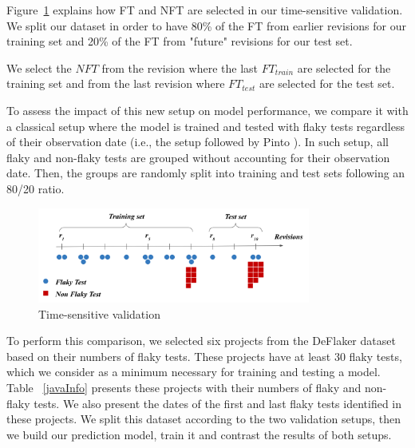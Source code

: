 Figure~\ref{time-validation} explains how FT and NFT are selected in our time-sensitive validation. We split our dataset in order to have 80\% of the FT from earlier revisions for our training set and 20\% of the FT from "future" revisions for our test set. 

We select the $NFT$ from the revision where the last $FT_{train}$ are selected for the training set and from the last revision where $FT_{test}$ are selected for the test set.

To assess the impact of this new setup on model performance, we compare it with a classical setup where the model is trained and tested with flaky tests regardless of their observation date (i.e., the setup followed by Pinto \etal).
In such setup, all flaky and non-flaky tests are grouped without accounting for their observation date. 
Then, the groups are randomly split into training and test sets following an 80/20 ratio. 

\begin{figure}
\centering
\includegraphics[width=0.8\textwidth]{figures/replication/fig1.png}
\caption{Time-sensitive validation}
\label{time-validation}
\end{figure}

To perform this comparison, we selected six projects from the DeFlaker dataset based on their numbers of flaky tests. 
These projects have at least 30 flaky tests, which we consider as a minimum necessary for training and testing a model. 
Table ~\ref{javaInfo} presents these projects with their numbers of flaky and non-flaky tests.
We also present the dates of the first and last flaky tests identified in these projects.
We split this dataset according to the two validation setups, then we build our prediction model, train it and contrast the results of both setups.

